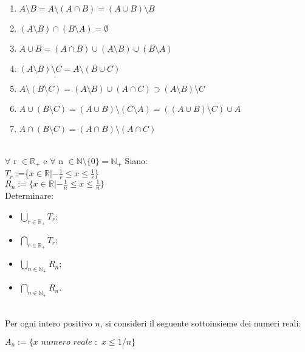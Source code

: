 \documentclass{article}
\begin{document}
\begin{enumerate}

\item $A \setminus B = A \setminus(A \cap B)=(A \cup B) \setminus B$

\item $(A \setminus B)\cap (B \setminus A)= \emptyset $ 

\item $A \cup B=(A \cap B) \cup (A \setminus B) \cup (B \setminus A)$

\item $(A \setminus B) \setminus C=A \setminus (B \cup C)$

\item $A \setminus (B \setminus C)=(A \setminus B) \cup (A \cap C)\supset (A \setminus B) \setminus C$

\item $A\cup (B \setminus C)=(A \cup B)\setminus (C \setminus A)=((A\cup B)\setminus C)\cup A $

\item $A\cap (B \setminus C)=(A \cap B) \setminus (A\cap C)$

\end{enumerate}
\vspace{0,2cm}
\\
$\forall$ r $\in \mathbb{R}_+$ e $\forall$ n $\in \mathbb{N}\setminus \{0\}=\mathbb{N}_+$ Siano:\\
$T_r$ :=\{$x\in \mathbb{R}|-\frac{1}{r} \leq x \leq \frac{1}{r}$\} \\$R_n :=\{x\in \mathbb{R}|-\frac{1}{n} \leq x \leq \frac{1}{n}\}$\\
Determinare:
\begin{itemize}
	\item $\bigcup_{r \in \mathbb{R}_+}T_r$;
	\item $\bigcap_{r \in \mathbb{R}_+}T_r$;
	\item $\bigcup_{n \in \mathbb{N}_+}R_n$;
	\item $\bigcap_{n \in \mathbb{N}_+}R_n$.

\end{itemize}
\vspace{0,2cm}
\\
Per ogni intero positivo $n$, si consideri il seguente sottoinsieme dei numeri reali:
\\
\begin{center}
$A_n :=\{x \, \, numero\, \, reale\,\, : \, \, x\leq 1/n \}$
\end{center}
\end{document}
